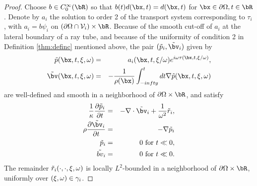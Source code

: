 \begin{proof}
Choose $b \in C_0^{\infty}(\bR)$ so that $b(t)d(\bx,t)=d(\bx,t)$ for
$\bx \in \partial \Omega, t \in \bR$. Denote by $a_i$ the solution to order 2 of
the transport system  corresponding to $\tau_i$, with $a_i=b\psi_i$ on $(\partial \Omega \cap
{\cal  V}_i) \times \bR$. Because of
the smooth cut-off of $a_i$ at the lateral boundary of a ray tube, and
because of the uniformity of condition 2 in Definition
\ref{thm:definc} mentioned above,  the pair
$(\tilde{p}_i,\tilde{\bv}_i)$ given by
\begin{eqnarray}
  \label{eqn:pgo}
  \tilde{p}(\bx,t,{\bf \xi},\omega) &=& a_i(\bx,t,{\bf
                                        \xi}/\omega)e^{i\omega\tau(\bx,t,{\bf
                                        \xi}/\omega)},\\
  \label{eqn:vgo}
  \tilde{\bv}(\bx,t,{\bf \xi},\omega) & = & -\frac{1}{\rho(\bx)}\int_{-infty}^t dt \nabla \tilde{p}(\bx,t,{\bf \xi},\omega)
\end{eqnarray}
are well-defined and smooth in a neighborhood of $\partial \Omega
\times \bR$, and satisfy
\begin{eqnarray}
\label{eqn:aweloc}
\frac{1}{\kappa}\frac{\partial \tilde{p}_i}{\partial t} & = & - \nabla \cdot \tilde{\bv}_i +
\frac{1}{\omega^2}\tilde{r}_i, \nonumber \\
\rho\frac{\partial \tilde{\bv}_i}{\partial t} & = & - \nabla \tilde{p}_i
                                               \nonumber \\
\tilde{p}_i & =& 0 \mbox{ for }  t \ll 0,\nonumber\\ 
\tilde{bv}_i & = & 0 \mbox{ for } t \ll 0.
\end{eqnarray}
The remainder $\tilde{r}_i(\cdot,\cdot,{\bf \xi},\omega)$ is locally
$L^2$-bounded in a neighborhood of $\partial \Omega \times \bR$,
uniformly over $({\bf \xi},\omega) \in \gamma_{i}$.


\end{proof}
